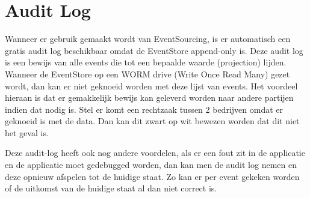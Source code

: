 
\section{Audit Log}
\label{sec:audit-log}

Wanneer er gebruik gemaakt wordt van EventSourcing, is er automatisch een gratis audit log beschikbaar omdat de EventStore append-only is. Deze audit log is een bewijs van alle events die tot een bepaalde waarde (projection) lijden. Wanneer de EventStore op een WORM drive (Write Once Read Many) gezet wordt, dan kan er niet geknoeid worden met deze lijst van events. Het voordeel hieraan is dat er gemakkelijk bewijs kan geleverd worden naar andere partijen indien dat nodig is. Stel er komt een rechtzaak tussen 2 bedrijven omdat er geknoeid is met de data. Dan kan dit zwart op wit bewezen worden dat dit niet het geval is.

Deze audit-log heeft ook nog andere voordelen, als er een fout zit in de applicatie en de applicatie moet gedebugged worden, dan kan men de audit log nemen en deze opnieuw afspelen tot de huidige staat. Zo kan er per event gekeken worden of de uitkomst van de huidige staat al dan niet correct is.